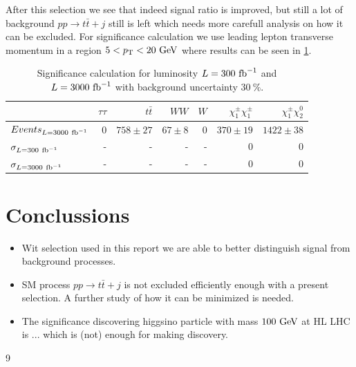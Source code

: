 \documentclass[tightenline,notitlepage,nofootinbib]{revtex4-1}
\begin{document}
After this selection we see that indeed signal ratio is improved, but still a lot of background $pp \to t \bar t + j$ still is left which needs more carefull analysis on how it can be excluded. For significance calculation we use leading lepton transverse momentum in a region $5<p_{\rm T}<20~\rm{GeV}$ where results can be seen in \cref{tab:select}.
\begin{table}[!ht]
  \setlength{\tabcolsep}{12pt}
  \centering
  \begin{tabular}{l|rrrrrr}
    & $\tau \tau$ & $t \bar t$ & $WW$ & $W$ & $\chi_1^{\pm} \chi_1^{\pm}$ &  $\chi_1^{\pm} \chi_2^0$ \\
    \hline
    $Events_{L=3000~\rm{fb}^{-1}}$  & 0 & $758 \pm 27$ & $67 \pm 8$ & 0 & $370 \pm 19$ & $1422 \pm 38$ \\
    $\sigma_{L=300~\rm{fb}^{-1}}$ & - & - & - & - & 0 & 0 \\
    $\sigma_{L=3000~\rm{fb}^{-1}}$ & - & - & - & - & 0 & 0 
  \end{tabular}
  \caption{Significance calculation for luminosity $L=300~\rm{fb}^{-1}$ and $L=3000~\rm{fb}^{-1}$ with background uncertainty $30~\%$.
  }
  \label{tab:select}
\end{table}

\section{Conclussions}

\begin{itemize}
\item Wit selection used in this report we are able to better distinguish signal from background processes.  
\item SM process $pp \to t \bar t + j$ is not excluded efficiently enough with a present selection. A further study of how it can be minimized is needed. 
\item The significance discovering higgsino particle with mass $100~\rm{GeV}$ at HL LHC is ... which is (not) enough for making discovery. 
\end{itemize}

%
{9}
%
  
\end{document}
